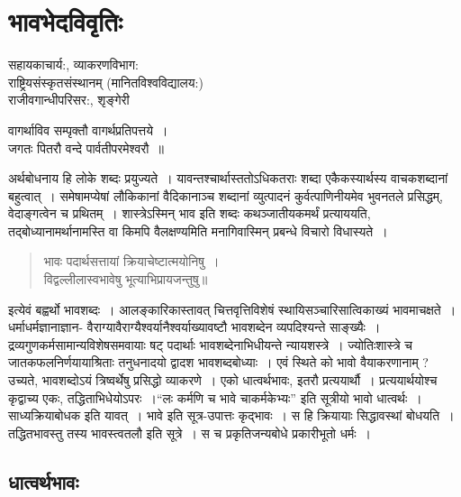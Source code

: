 {\fontsize{15}{17}\selectfont
\presetvalues
\chapter{भावभेदविवृतिः}

\begin{center}
\smallskip

सहायकाचार्य:, व्याकरणविभाग:\\
राष्ट्रियसंस्कृतसंस्थानम् (मानितविश्वविद्यालय:)\\
राजीवगान्धीपरिसर:, शृङ्गेरी
\addrule
\end{center}

\begin{center}
{वागर्थाविव सम्पृक्तौ वागर्थप्रतिपत्तये~। }\\
{जगतः पितरौ वन्दे पार्वतीपरमेश्वरौ~॥}
\end{center}
अर्थबोधनाय हि लोके शब्दः प्रयुज्यते~। यावन्तश्चार्थास्ततोऽधिकतराः शब्दा एकैकस्यार्थस्य वाचकशब्दानां बहुत्वात्~। समेषामप्येषां लौकिकानां वैदिकानाञ्च शब्दानां व्युत्पादनं कुर्वत्पाणिनीयमेव भुवनतले प्रसिद्धम्, वेदाङ्गत्वेन च प्रथितम्~। शास्त्रेऽस्मिन् भाव इति शब्दः कथञ्जातीयकमर्थं प्रत्याययति, तद्बोध्यानामर्थानामस्ति वा किमपि वैलक्षण्यमिति मनागिवास्मिन् प्रबन्धे विचारो विधास्यते~। 
\begin{verse}
{भावः पदार्थसत्तायां क्रियाचेष्टात्मयोनिषु~। }\\
{विद्वल्लीलास्वभावेषु भूत्याभिप्रायजन्तुषु॥}
\end{verse}
इत्येवं बह्वर्थो भावशब्दः~। आलङ्कारिकास्तावत् चित्तवृत्तिविशेषं स्थायिसञ्चारिसात्विकाख्यं भावमाचक्षते~। धर्माधर्मज्ञानाज्ञान- वैराग्यावैराग्यैश्वर्यानैश्वर्याख्यावष्टौ भावशब्देन  व्यपदिश्यन्ते  साङ्ख्यैः~। द्रव्यगुणकर्मसामान्यविशेषसमवायाः षट् पदार्थाः भावशब्देनाभिधीयन्ते न्यायशस्त्रे~। ज्योतिःशास्त्रे च जातकफलनिर्णयायाश्रिताः तनुधनादयो द्वादश भावशब्द\-बोध्याः~। एवं स्थिते को भावो वैयाकरणानाम् ? 
उच्यते, भावशब्दोऽयं त्रिष्वर्थेषु प्रसिद्धो व्याकरणे~। एको धात्वर्थभावः, इतरौ प्रत्ययार्थौ~। प्रत्ययार्थयोश्च कृद्वाच्य एकः, तद्धिताभिधेयोऽपरः~।\break “लः कर्मणि च भावे चाकर्मकेभ्यः” इति सूत्रीयो भावो धात्वर्थः~। साध्यक्रियाबोधक इति यावत्~। भावे इति सूत्र-उपात्तः \hbox{कृद्भावः~।} स हि क्रियायाः सिद्धावस्थां बोधयति~। तद्धितभावस्तु तस्य भावस्त्वतलौ इति सूत्रे~। स च प्रकृतिजन्यबोधे प्रकारीभूतो धर्मः~। 
~\\[-1cm]
\section*{धात्वर्थभावः} 

}
